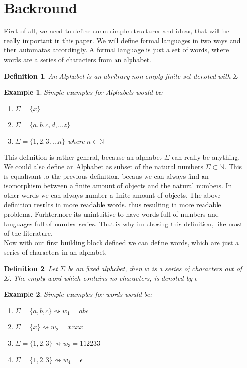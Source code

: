 \documentclass[12pt,letterpaper]{article}
\newtheorem{definition}{Definition}
\newtheorem{example}{Example}[section]
\begin{document}
\section{Backround}
First of all, we need to define some simple structures and ideas,
that will be really important in this paper. We will define 
formal languages in two ways and then automatas arcordingly.
A formal language is just a set of words, where words are 
a series of characters from an alphabet.
\begin{definition}
  An Alphabet is an abritrary non empty finite set denoted with $\Sigma$
\end{definition}
\begin{example} Simple examples for Alphabets would be:
  \begin{enumerate}
    \item $\Sigma = \{x\}$
    \item $\Sigma = \{a,b,c,d, \dots z \}$
    \item $\Sigma = \{1,2,3, \dots n \}$ where $n \in \mathbb{N}$
  \end{enumerate}
\end{example}
This definition is rather general, because an alphabet $\Sigma$
can really be anything. We could also define an Alphabet as subset of
the natural numbers $\Sigma \subset \mathbb{N}$. This is equalivant to
the previous definition, becaus we can always find an isomorphism between
a finite amount of objects and the natural numbers. In other words 
we can always number a finite amount of objects. The above definition
results in more readable words, thus resulting in more readable problems.
Furhtermore its unintuitive to have words full of numbers and languages
full of number series. That is why im chosing this definition, like most
of the literature.\\
Now with our first building block defined we can define words, which are just
a series of characters in an alphabet.
\begin{definition}
  Let $\Sigma$ be an fixed alphabet, then $w$ is a series of characters out of
  $\Sigma$. The empty word which contains no characters, 
  is denoted by $\epsilon$
\end{definition}
\begin{example}
  Simple examples for words would be:
  \begin{enumerate}
    \item $\Sigma = \{a,b,c\} \rightsquigarrow w_1 = abc$
    \item $\Sigma = \{x\} \rightsquigarrow w_2 = xxxx$
    \item $\Sigma = \{1,2,3\} \rightsquigarrow w_3 = 112233$
    \item $\Sigma = \{1,2,3\} \rightsquigarrow w_4 = \epsilon$
  \end{enumerate}
\end{example}
\end{document}
